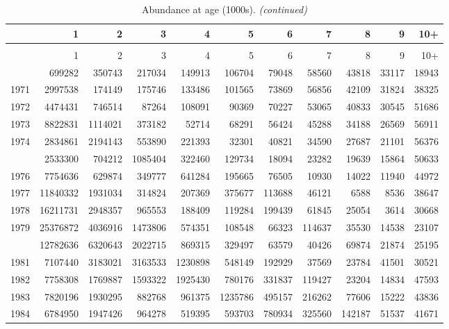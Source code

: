 \documentclass[
]{article}
\begin{document}
\begin{longtable}[t]{lrrrrrrrrrr}
\caption{\label{tab:NAA-table}Abundance at age (1000s).}\\
\toprule
  & 1 & 2 & 3 & 4 & 5 & 6 & 7 & 8 & 9 & 10+\\
\midrule
\endfirsthead
\caption[]{Abundance at age (1000s). \textit{(continued)}}\\
\toprule
  & 1 & 2 & 3 & 4 & 5 & 6 & 7 & 8 & 9 & 10+\\
\midrule
\endhead

\endfoot
\bottomrule
\endlastfoot
1970 & 699282 & 350743 & 217034 & 149913 & 106704 & 79048 & 58560 & 43818 & 33117 & 18943\\
1971 & 2997538 & 174149 & 175746 & 133486 & 101565 & 73869 & 56856 & 42109 & 31824 & 38325\\
1972 & 4474431 & 746514 & 87264 & 108091 & 90369 & 70227 & 53065 & 40833 & 30545 & 51686\\
1973 & 8822831 & 1114021 & 373182 & 52714 & 68291 & 56424 & 45288 & 34188 & 26569 & 56911\\
1974 & 2834861 & 2194143 & 553890 & 221393 & 32301 & 40821 & 34590 & 27687 & 21101 & 56376\\
\addlinespace
1975 & 2533300 & 704212 & 1085404 & 322460 & 129734 & 18094 & 23282 & 19639 & 15864 & 50633\\
1976 & 7754636 & 629874 & 349777 & 641284 & 195665 & 76505 & 10930 & 14022 & 11940 & 44972\\
1977 & 11840332 & 1931034 & 314824 & 207369 & 375677 & 113688 & 46121 & 6588 & 8536 & 38647\\
1978 & 16211731 & 2948357 & 965553 & 188409 & 119284 & 199439 & 61845 & 25054 & 3614 & 30668\\
1979 & 25376872 & 4036916 & 1473806 & 574351 & 108548 & 66323 & 114637 & 35530 & 14538 & 23107\\
\addlinespace
1980 & 12782636 & 6320643 & 2022715 & 869315 & 329497 & 63579 & 40426 & 69874 & 21874 & 25195\\
1981 & 7107440 & 3183021 & 3163533 & 1230898 & 548149 & 192929 & 37569 & 23784 & 41501 & 30521\\
1982 & 7758308 & 1769887 & 1593322 & 1925430 & 780176 & 331837 & 119427 & 23204 & 14834 & 47593\\
1983 & 7820196 & 1930295 & 882768 & 961375 & 1235786 & 495157 & 216262 & 77606 & 15222 & 43836\\
1984 & 6784950 & 1947426 & 964278 & 519395 & 593703 & 780934 & 325560 & 142187 & 51537 & 41671\\

\end{longtable}
\end{document}

